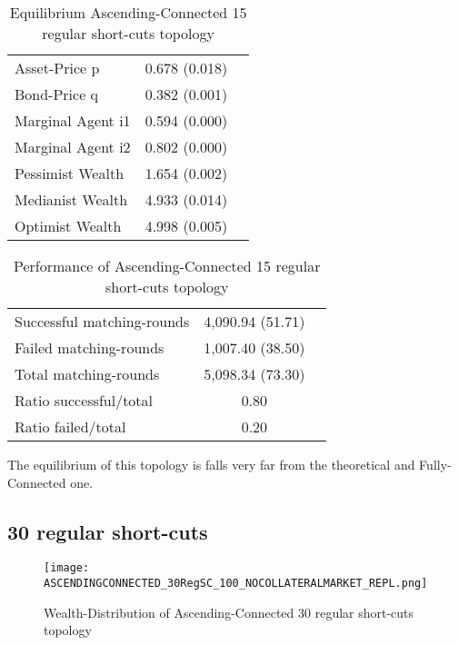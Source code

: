 \documentclass[Bachelorarbeit.tex]{subfiles}
\begin{document}
\begin{table}[H]
	\caption{Equilibrium Ascending-Connected 15 regular short-cuts topology}
	\centering
	\begin{tabular} { l c r }
		\hline
		Asset-Price p & 0.678 (0.018) \\
		Bond-Price q & 0.382 (0.001) \\
		Marginal Agent i1 & 0.594 (0.000) \\
		Marginal Agent i2 & 0.802 (0.000) \\
		\hline
		Pessimist Wealth & 1.654 (0.002) \\
		Medianist Wealth & 4.933 (0.014) \\
		Optimist Wealth & 4.998 (0.005) \\
		\hline
	\end{tabular}
\end{table} 

\begin{table}[H]
	\caption{Performance of Ascending-Connected 15 regular short-cuts topology}
	\centering
	\begin{tabular} { l c r }
		\hline
		Successful matching-rounds & 4,090.94 (51.71) \\
		Failed matching-rounds & 1,007.40 (38.50) \\
		Total matching-rounds & 5,098.34 (73.30) \\
		\hline
		Ratio successful/total & 0.80 \\
		Ratio failed/total & 0.20 \\
		\hline
	\end{tabular}
\end{table}

The equilibrium of this topology is falls very far from the theoretical and Fully-Connected one.

\subsection{30 regular short-cuts}
\begin{figure}[H]
	\centering
  \texttt{[image: ASCENDINGCONNECTED\_30RegSC\_100\_NOCOLLATERALMARKET\_REPL.png]}
	\caption{Wealth-Distribution of Ascending-Connected 30 regular short-cuts topology}
	\label{fig:wealth_ASCENDINGCONNECTED_30RegSC_100_NOCOLLATERALMARKET_REPL}
\end{figure}
\end{document}
